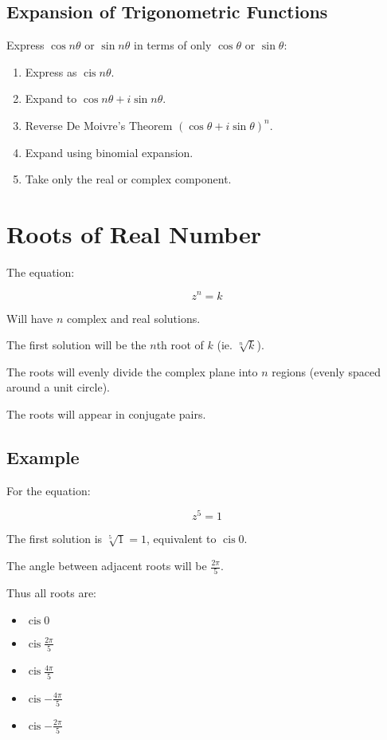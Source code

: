 \documentclass[a4paper,11pt]{article}
\DeclareMathOperator\cis{cis}
\begin{document}
\subsection{Expansion of Trigonometric Functions}

Express $\cos{n \theta}$ or $\sin{n \theta}$ in terms of only $\cos{\theta}$ or
$\sin{\theta}$:

\begin{enumerate}
\item Express as $\cis{n \theta}$.
\item Expand to $\cos{n \theta} + i \sin{n \theta}$.
\item Reverse De Moivre's Theorem $(\cos{\theta} + i \sin{\theta})^n$.
\item Expand using binomial expansion.
\item Take only the real or complex component.
\end{enumerate}




\section{Roots of Real Number}

The equation:

$$
z^n = k
$$

Will have $n$ complex and real solutions.

The first solution will be the $n$th root of $k$ (ie. $\sqrt[n]{k}$).

The roots will evenly divide the complex plane into $n$ regions (evenly spaced
around a unit circle).

The roots will appear in conjugate pairs.


\subsection{Example}

For the equation:

$$
z^5 = 1
$$

The first solution is $\sqrt[5]{1} = 1$, equivalent to $\cis{0}$.

The angle between adjacent roots will be $\frac{2\pi}{5}$.

Thus all roots are:

\begin{itemize}
\item $\cis{0}$
\item $\cis{\frac{2\pi}{5}}$
\item $\cis{\frac{4\pi}{5}}$
\item $\cis{-\frac{4\pi}{5}}$
\item $\cis{-\frac{2\pi}{5}}$
\end{itemize}
\end{document}
